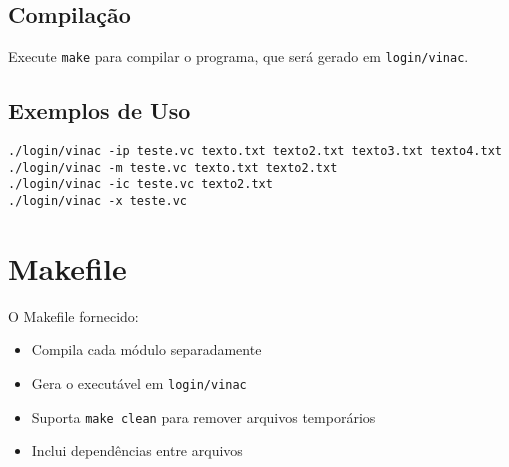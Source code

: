 \documentclass{article}
\begin{document}
\subsection{Compilação}
Execute \texttt{make} para compilar o programa, que será gerado em \texttt{login/vinac}.

\subsection{Exemplos de Uso}
\begin{verbatim}
./login/vinac -ip teste.vc texto.txt texto2.txt texto3.txt texto4.txt
./login/vinac -m teste.vc texto.txt texto2.txt
./login/vinac -ic teste.vc texto2.txt
./login/vinac -x teste.vc
\end{verbatim}

\section{Makefile}
O Makefile fornecido:
\begin{itemize}
    \item Compila cada módulo separadamente
    \item Gera o executável em \texttt{login/vinac}
    \item Suporta \texttt{make clean} para remover arquivos temporários
    \item Inclui dependências entre arquivos
\end{itemize}
\end{document}
